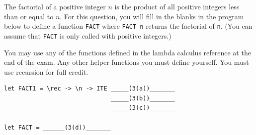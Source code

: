 \documentclass[addpoints]{exam}
\begin{document}
\begin{questions}
\begin{parts}
\end{parts}

\newpage

\question The factorial of a positive integer $n$ is the product of all positive integers less than or equal to $n$.  For this question, you will fill in the blanks in the program below to define a function \verb|FACT| where \verb|FACT n| returns the factorial of \verb|n|.  (You can assume that \verb|FACT| is only called with positive integers.)

You may use any of the functions defined in the lambda calculus reference at the end of the exam.  Any other helper functions you must define yourself.  You must use recursion for full credit.

\begin{verbatim}
let FACT1 = \rec -> \n -> ITE _____(3(a))_______
                              _____(3(b))_______
                              _____(3(c))_______
                      
let FACT = ______(3(d))_______
\end{verbatim}

\end{questions}
\end{document}
